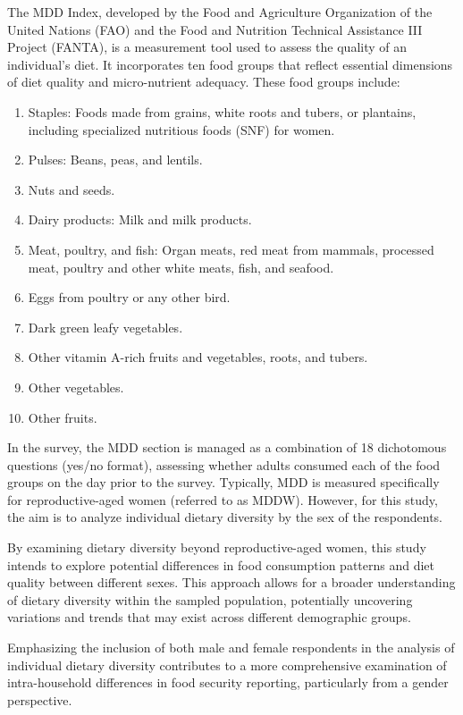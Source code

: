 \documentclass[11pt,harvard]{article}
\begin{document}
The MDD Index, developed by the Food and Agriculture Organization of the United Nations (FAO) and the Food and Nutrition Technical Assistance III Project (FANTA), is a measurement tool used to assess the quality of an individual's diet. It incorporates ten food groups that reflect essential dimensions of diet quality and micro-nutrient adequacy. These food groups include:

\begin{enumerate}[label=\arabic*.]
	\item Staples: Foods made from grains, white roots and tubers, or plantains, including specialized nutritious foods (SNF) for women.
	\item Pulses: Beans, peas, and lentils.
	\item Nuts and seeds.
	\item Dairy products: Milk and milk products.
	\item Meat, poultry, and fish: Organ meats, red meat from mammals, processed meat, poultry and other white meats, fish, and seafood.
	\item Eggs from poultry or any other bird.
	\item Dark green leafy vegetables.
	\item Other vitamin A-rich fruits and vegetables, roots, and tubers.
	\item Other vegetables.
	\item Other fruits.
\end{enumerate}

In the survey, the MDD section is managed as a combination of 18 dichotomous questions (yes/no format), assessing whether adults consumed each of the food groups on the day prior to the survey. Typically, MDD is measured specifically for reproductive-aged women (referred to as MDDW). However, for this study, the aim is to analyze individual dietary diversity by the sex of the respondents.

By examining dietary diversity beyond reproductive-aged women, this study intends to explore potential differences in food consumption patterns and diet quality between different sexes. This approach allows for a broader understanding of dietary diversity within the sampled population, potentially uncovering variations and trends that may exist across different demographic groups.

Emphasizing the inclusion of both male and female respondents in the analysis of individual dietary diversity contributes to a more comprehensive examination of intra-household differences in food security reporting, particularly from a gender perspective.
\end{document}
